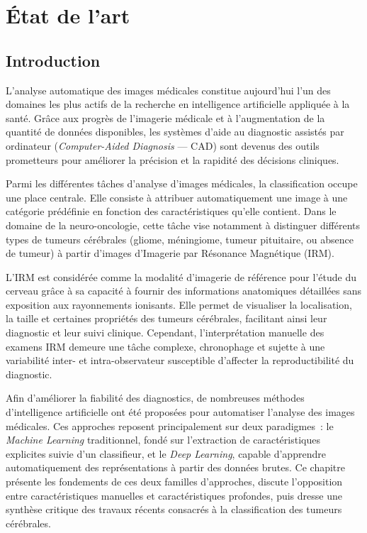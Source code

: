 \chapter{État de l'art}

\section{Introduction}

L'analyse automatique des images médicales constitue aujourd'hui l'un des domaines les plus
actifs de la recherche en intelligence artificielle appliquée à la santé. Grâce aux progrès de
l'imagerie médicale et à l'augmentation de la quantité de données disponibles, les systèmes
d'aide au diagnostic assistés par ordinateur (\emph{Computer-Aided Diagnosis} --- CAD) sont
devenus des outils prometteurs pour améliorer la précision et la rapidité des décisions
cliniques.

Parmi les différentes tâches d'analyse d'images médicales, la classification occupe une place
centrale. Elle consiste à attribuer automatiquement une image à une catégorie prédéfinie en
fonction des caractéristiques qu'elle contient. Dans le domaine de la neuro-oncologie, cette
tâche vise notamment à distinguer différents types de tumeurs cérébrales (gliome, méningiome,
tumeur pituitaire, ou absence de tumeur) à partir d'images d'Imagerie par Résonance
Magnétique (IRM).

L'IRM est considérée comme la modalité d'imagerie de référence pour l'étude du cerveau grâce à
sa capacité à fournir des informations anatomiques détaillées sans exposition aux rayonnements
ionisants. Elle permet de visualiser la localisation, la taille et certaines propriétés des
tumeurs cérébrales, facilitant ainsi leur diagnostic et leur suivi clinique. Cependant,
l'interprétation manuelle des examens IRM demeure une tâche complexe, chronophage et sujette à
une variabilité inter- et intra-observateur susceptible d'affecter la reproductibilité du
diagnostic.

Afin d'améliorer la fiabilité des diagnostics, de nombreuses méthodes d'intelligence
artificielle ont été proposées pour automatiser l'analyse des images médicales. Ces approches
reposent principalement sur deux paradigmes~: le \emph{Machine Learning} traditionnel, fondé
sur l'extraction de caractéristiques explicites suivie d'un classifieur, et le \emph{Deep
Learning}, capable d'apprendre automatiquement des représentations à partir des données brutes.
Ce chapitre présente les fondements de ces deux familles d'approches, discute l'opposition
entre caractéristiques manuelles et caractéristiques profondes, puis dresse une synthèse
critique des travaux récents consacrés à la classification des tumeurs cérébrales.

